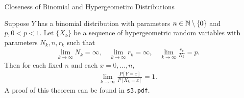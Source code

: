 \begin{frame}{Closeness of Binomial and Hypergeometirc Distributions}

\justifying
{} Suppose $Y$ has a binomial distribution with parameters $n\in \mathbb{N}\setminus\{0\}$ and $p, 0 < p < 1$. Let $\{X_k\}$ be a sequence of hypergeometric random variables with parameters $N_k, n, r_k$ such that
\begin{align*}
\lim_{k\rightarrow \infty} N_k = \infty, \quad \lim_{k\rightarrow \infty} r_k = \infty, \quad \lim_{k\rightarrow \infty} \frac{r_k}{N_k} = p.
\end{align*}
Then for each fixed $n$ and each $x = 0, \ldots, n$,
\begin{align*}
\lim_{k\rightarrow \infty} \frac{P[Y=x]}{P[X_k=x]} = 1.
\end{align*}
A proof of this theorem can be found in \texttt{s3.pdf}.

\end{frame}

